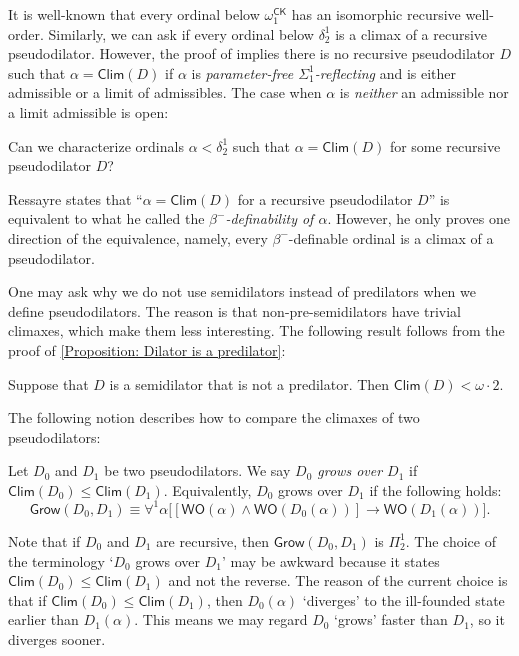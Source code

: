 \documentclass{mhkr}
\newcommand{\added}[1]{#1}
\newcommand{\WO}{\mathsf{WO}}
\newcommand{\Clim}{\mathsf{Clim}}
\newcommand{\Grow}{\mathsf{Grow}}
\newcommand{\CK}{\mathsf{CK}}
\begin{document}
It is well-known that every ordinal below $\omega_1^\CK$ has an isomorphic recursive well-order. Similarly, we can ask if every ordinal below $\delta^1_2$ is a climax of a recursive pseudodilator.
However, the proof of \cite[Theorem 24]{AguileraPakhomov2023Pi12} implies there is no recursive pseudodilator $D$ such that $\alpha = \Clim(D)$ if $\alpha$ is \emph{parameter-free $\Sigma^1_1$-reflecting} and is either admissible or a limit of admissibles. The case when $\alpha$ is \emph{neither} an admissible nor a limit admissible is open:
\begin{question}
    Can we characterize ordinals $\alpha < \delta^1_2$ such that $\alpha = \Clim(D)$ for some recursive pseudodilator $D$?
\end{question}
\added{Ressayre \cite[Proposition III.7]{Ressayre1982BoundingGRF} states that ``$\alpha = \Clim(D)$ for a recursive pseudodilator $D$'' is equivalent to what he called the \emph{$\beta^-$-definability of $\alpha$}. However, he only proves one direction of the equivalence, namely, every $\beta^-$-definable ordinal is a climax of a pseudodilator.}

One may ask why we do not use semidilators instead of predilators when we define pseudodilators. The reason is that non-pre-semidilators have trivial climaxes, which make them less interesting.
The following result follows from the proof of \autoref{Proposition: Dilator is a predilator}:
\begin{proposition} \label{Proposition: Climax is a semidilator is trivial} \pushQED{\qed}
    Suppose that $D$ is a semidilator that is not a predilator. Then $\Clim(D)<\omega\cdot 2$. \qedhere 
\end{proposition}

The following notion describes how to compare the climaxes of two pseudodilators:
\begin{definition}
    Let $D_0$ and $D_1$ be two pseudodilators. We say \emph{$D_0$ grows over $D_1$} if $\Clim(D_0)\le \Clim(D_1)$. Equivalently, $D_0$ grows over $D_1$ if the following holds:
    \begin{equation*}
        \Grow(D_0,D_1)\equiv \forall^1 \alpha \bigl[[\WO(\alpha)\land \WO(D_0(\alpha))]\to \WO(D_1(\alpha))\bigr].
    \end{equation*}
\end{definition}
Note that if $D_0$ and $D_1$ are recursive, then $\Grow(D_0,D_1)$ is $\Pi^1_2$.
The choice of the terminology `$D_0$ grows over $D_1$' may be awkward because it states $\Clim(D_0) \le \Clim(D_1)$ and not the \added{reverse}. The reason of the current choice is that if $\Clim(D_0)\le \Clim(D_1)$, then $D_0(\alpha)$ `diverges' to the ill-founded state earlier than $D_1(\alpha)$. This means we may regard $D_0$ `grows' faster than $D_1$, so it diverges sooner. 
\end{document}
